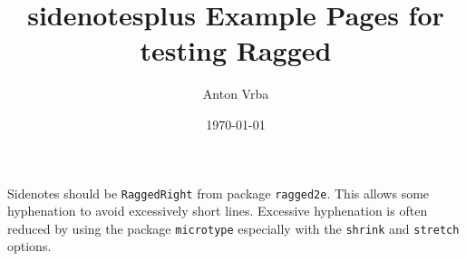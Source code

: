 \documentclass[twoside,10pt,ragged]{article}
\title{\textbf{\textsf{sidenotesplus}} Example Pages for testing Ragged}
\author{Anton Vrba}
\date{\today}
\begin{document}
\maketitle

Sidenotes should be \verb|RaggedRight| from package \verb|ragged2e|.
This allows some hyphenation to avoid excessively short lines.
Excessive hyphenation is often reduced by using the package \verb|microtype|
especially with the \verb|shrink| and \verb|stretch| options.

\bigbreak

\lipsum[1]\sidenote{\lipsum[2]}
\end{document}
